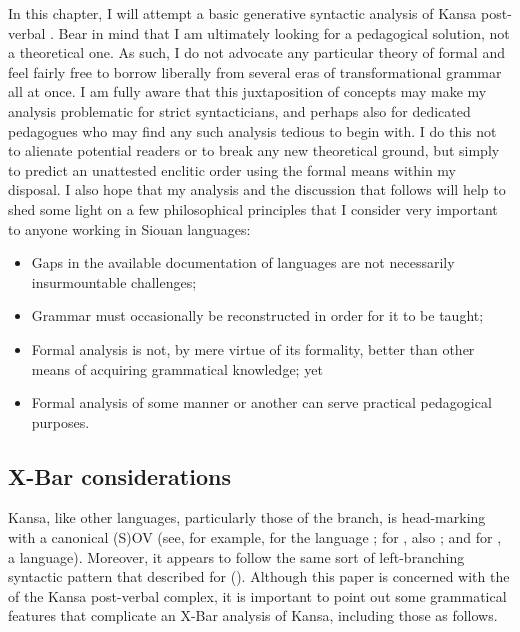 \documentclass[output=paper]{LSP/langsci}
\begin{document}
In this chapter, I will attempt a basic generative syntactic analysis of Kansa post-verbal . Bear in mind that I am ultimately looking for a pedagogical solution, not a theoretical one. As such, I do not advocate any particular theory of formal  and feel fairly free to borrow liberally from several eras of transformational grammar all at once. I am fully aware that this juxtaposition of concepts may make my analysis problematic for strict syntacticians, and perhaps also for dedicated pedagogues who may find any such analysis tedious to begin with. I do this not to alienate potential readers or to break any new theoretical ground, but simply to predict an unattested enclitic order using the formal means within my disposal. I also hope that my analysis and the discussion that follows will help to shed some light on a few philosophical principles that I consider very important to anyone working in Siouan languages:

\begin{itemize}
\item Gaps in the available documentation of languages are not necessarily insurmountable challenges;
\item Grammar must occasionally be reconstructed in order for it to be taught;
\item Formal analysis is not, by mere virtue of its formality, better than other means of acquiring grammatical knowledge; yet
\item Formal analysis of some manner or another can serve practical pedagogical purposes.
\end{itemize}

\subsection{X-Bar considerations}
Kansa, like other  languages, particularly those of the  branch, is head-marking with a canonical (S)OV  (see, for example, \citet[421]{Quintero2004} for the  language ; \citet[488--490]{Rankin2005b} for , also ; and \citet[369]{Cumberland2005} for , a  language). Moreover, it appears to follow the same sort of left-branching syntactic pattern that \citet{Boyle2007} described for  (). Although this paper is concerned with the  of the Kansa post-verbal complex, it is important to point out some grammatical features that complicate an X-Bar analysis of Kansa, including those as follows.
\end{document}
